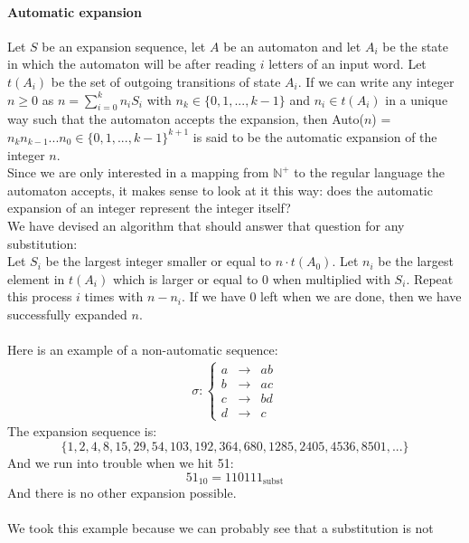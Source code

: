 \documentclass{article}
\begin{document}
\paragraph{Automatic expansion}
Let $S$ be an expansion sequence, let $A$ be an automaton and let $A_i$ be 
the state in which the automaton will be after reading $i$ letters of an 
input word. Let $t(A_i)$ be the set of outgoing transitions of state $A_i$.
If we can write any integer $n \ge 0$ as $n = \sum_{i = 0}^k n_i S_i$ with 
$n_k \in \{0, 1, ..., k - 1\}$ and $n_i \in t(A_i)$ in a unique way such that 
the automaton accepts the expansion, then Auto($n$) = 
$n_k n_{k - 1} ... n_0 \in \{0, 1, ..., k - 1\}^{k + 1}$ is said to be the
automatic expansion of the integer $n$.\\
Since we are only interested in a mapping from $\mathbb{N}^+$ to the regular
language the automaton accepts, it makes sense to look at it this way: does
the automatic expansion of an integer represent the integer itself?\\
We have devised an algorithm that should answer that question for any
substitution:\\
Let $S_i$ be the largest integer smaller or equal to $n \cdot t(A_0)$. Let 
$n_i$ be the largest element in $t(A_i)$ which is larger or equal to 0 when 
multiplied with $S_i$. Repeat this process $i$ times with $n - n_i$. If we have
0 left when we are done, then we have successfully expanded $n$.\\
\\
Here is an example of a non-automatic sequence:
\begin{eqnarray*}
\sigma: \left\{ \begin{array}{lll}
a &\rightarrow& ab\\
b &\rightarrow& ac\\
c &\rightarrow& bd\\
d &\rightarrow& c
\end{array} \right.
\end{eqnarray*}
The expansion sequence is:
\begin{displaymath}
\{1, 2, 4, 8, 15, 29, 54, 103, 192, 364, 680, 1285, 2405, 4536, 8501, ... \}
\end{displaymath}
And we run into trouble when we hit 51:
\begin{displaymath}
51_{10} = 110111_{\mathrm{subst}}
\end{displaymath}
And there is no other expansion possible.\\
\\
We took this example because we can probably see that a substitution is not
\end{document}
